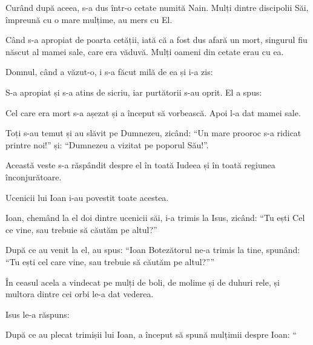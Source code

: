 {\par }{\PP {}Curând după aceea, s-a dus într-o cetate numită Nain. Mulți dintre discipolii Săi, împreună cu o mare mulțime, au mers cu El.

Când s-a apropiat de poarta cetății, iată că a fost dus afară un mort, singurul fiu născut al mamei sale, care era văduvă. Mulți oameni din cetate erau cu ea.

Domnul, când a văzut-o, i s-a făcut milă de ea și i-a zis:
{}

S-a apropiat și s-a atins de sicriu, iar purtătorii s-au oprit. El a spus:
{}

Cel care era mort s-a așezat și a început să vorbească. Apoi l-a dat mamei sale.


\par }{\PP {}Toți s-au temut și au slăvit pe Dumnezeu, zicând: “Un mare prooroc s-a ridicat printre noi!” și: “Dumnezeu a vizitat pe poporul Său!”.

Această veste s-a răspândit despre el în toată Iudeea și în toată regiunea înconjurătoare.


\par }{\PP {}Ucenicii lui Ioan i-au povestit toate acestea.

Ioan, chemând la el doi dintre ucenicii săi, i-a trimis la Isus, zicând: “Tu ești Cel ce vine, sau trebuie să căutăm pe altul?”

După ce au venit la el, au spus: “Ioan Botezătorul ne-a trimis la tine, spunând: “Tu ești cel care vine, sau trebuie să căutăm pe altul?””


\par }{\PP {}În ceasul acela a vindecat pe mulți de boli, de molime și de duhuri rele, și multora dintre cei orbi le-a dat vederea.

Isus le-a răspuns:
{}



\par }{\PP {}După ce au plecat trimișii lui Ioan, a început să spună mulțimii despre Ioan: “{}

}
